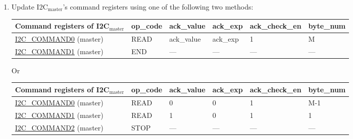 \documentclass[main\_\_EN.tex]{subfiles}
\begin{document}
\begin{enumerate}
\item Update I2C$_\text{master}$'s command registers using one of the following two methods:

\begin{longtable}{ | p{4cm} | p{2cm} | p{2cm} | p{2cm} |p{2cm} | p{2cm} |}
\hline\rowcolor{lightgray}
Command registers of I2C$_\text{master}$& op\_code & ack\_value&ack\_exp&ack\_check\_en&byte\_num  \\ \hline
\hyperref[fielddesc:I2CCOMMAND0]{I2C\_COMMAND0} (master)& READ& ack\_value&ack\_exp&1&M  \\ \hline
\hyperref[fielddesc:I2CCOMMAND1]{I2C\_COMMAND1} (master)& END& ---&---&---&---  \\ \hline
\end{longtable}

Or

\begin{longtable}{ | p{4cm} | p{2cm} | p{2cm} | p{2cm} |p{2cm} | p{2cm} |}
\hline\rowcolor{lightgray}
Command registers of I2C$_\text{master}$& op\_code & ack\_value&ack\_exp&ack\_check\_en&byte\_num  \\ \hline
\hyperref[fielddesc:I2CCOMMAND0]{I2C\_COMMAND0} (master)& READ& 0&0&1&M-1  \\ \hline
\hyperref[fielddesc:I2CCOMMAND1]{I2C\_COMMAND1} (master)& READ& 1&0&1&1  \\ \hline
\hyperref[fielddesc:I2CCOMMAND2]{I2C\_COMMAND2} (master)& STOP& ---&---&---&---  \\ \hline
\end{longtable}


\end{enumerate}
\end{document}
